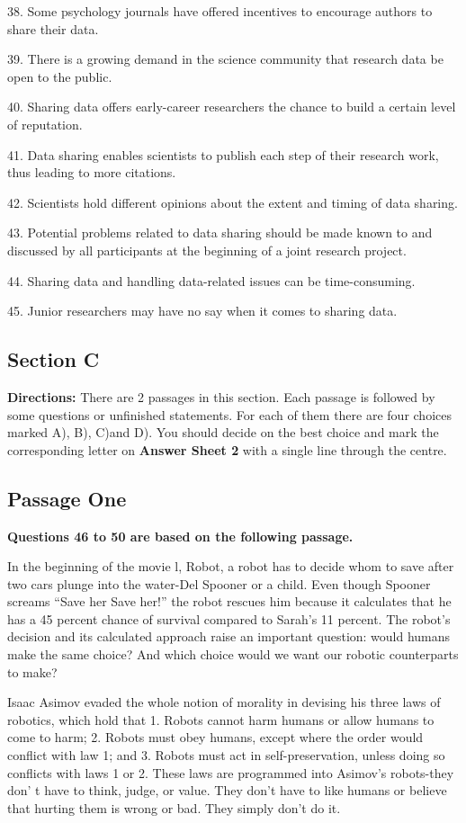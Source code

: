 \documentclass[UTF8,11pt]{ctexart}
\begin{document}
38. Some psychology journals have offered incentives to encourage authors to share their data.


39. There is a growing demand in the science community that research data be open to the public.


40. Sharing data offers early-career researchers the chance to build a certain level of reputation.


41. Data sharing enables scientists to publish each step of their research work, thus leading to more citations.


42. Scientists hold different opinions about the extent and timing of data sharing.


43. Potential problems related to data sharing should be made known to and discussed by all participants at the beginning of a joint research project.


44. Sharing data and handling data-related issues can be time-consuming.


45. Junior researchers may have no say when it comes to sharing data.


\subsection*{\textbf{Section C}}


\textbf{Directions:} There are 2 passages in this section. Each passage is followed by some questions or unfinished statements. For each of them there are four choices marked A), B), C)and D). You should decide on the best choice and mark the corresponding letter on\textbf{ Answer Sheet 2} with a single line through the centre.


\subsection*{\textbf{Passage One}}


\textbf{Questions 46 to 50 are based on the following passage.}


In the beginning of the movie l, Robot, a robot has to decide whom to save after two cars plunge into the water-Del Spooner or a child. Even though Spooner screams “Save her Save her!” the robot rescues him because it calculates that he has a 45 percent chance of survival compared to Sarah's 11 percent. The robot's decision and its calculated approach raise an important question: would humans make the same choice? And which choice would we want our robotic counterparts to make?


Isaac Asimov evaded the whole notion of morality in devising his three laws of robotics, which hold that 1. Robots cannot harm humans or allow humans to come to harm; 2. Robots must obey humans, except where the order would conflict with law 1; and 3. Robots must act in self-preservation, unless doing so conflicts with laws 1 or 2. These laws are programmed into Asimov's robots-they don' t have to think, judge, or value. They don't have to like humans or believe that hurting them is wrong or bad. They simply don't do it.
\end{document}
